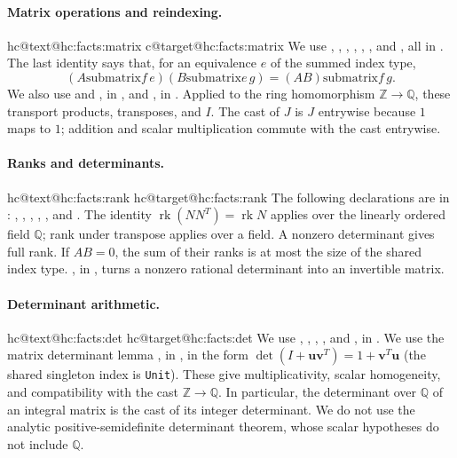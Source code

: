 \documentclass[11pt]{amsart}
\makeatletter
\newcommand\ints{{\mathbb Z}}
\newcommand\rats{{\mathbb Q}}
\newcommand\Zu{{\mathbf u}}
\newcommand\Zv{{\mathbf v}}
\let\hcSavedLabel\label
\renewcommand{\label}[1]{%
  \hcSavedLabel{#1}%
  \expandafter\protected@xdef\csname hc@text@#1\endcsname{\@currentlabel}%
  \expandafter\xdef\csname hc@target@#1\endcsname{\@currentHref}}
\makeatother
\begin{document}
\paragraph{Matrix operations and reindexing.}\makeatletter{}\makeatother\label{hc:facts:matrix}
\uses{}
We use , ,
, ,
, , and
, all in .
The last identity says that, for
an equivalence $e$ of the summed index type,
\[
 (A\mathbin{\mathrm{submatrix}}f\,e)
 (B\mathbin{\mathrm{submatrix}}e\,g)
       =(AB)\mathbin{\mathrm{submatrix}}f\,g.
\]
We also use  and
, in
, and , in
. Applied to the ring homomorphism
$\ints\to\rats$, these transport products, transposes, and $I$.
The cast of $J$ is $J$ entrywise because $1$ maps to $1$; addition
and scalar multiplication commute with the cast entrywise.

\paragraph{Ranks and determinants.}\makeatletter\def\@currentlabel{F3}\makeatother\label{hc:facts:rank}
\uses{}
The following declarations are in
:
, ,
, ,
, and
.
The identity $\operatorname{rk}(NN^T)=\operatorname{rk}N$ applies over
the linearly ordered field $\rats$; rank under transpose applies over
a field. A nonzero determinant gives full rank. If $AB=0$, the sum
of their ranks is at most the size of the shared index type.
, in
, turns a nonzero
rational determinant into an invertible matrix.

\paragraph{Determinant arithmetic.}\makeatletter\def\@currentlabel{F4}\makeatother\label{hc:facts:det}
\uses{}
We use , ,
, , and , in
.
We use the matrix determinant lemma
, in
, in the form
$\det(I+\Zu\Zv^T)=1+\Zv^T\Zu$ (the shared singleton index is
\texttt{Unit}). These give multiplicativity, scalar homogeneity,
and compatibility with the cast $\ints\to\rats$. In particular, the
determinant over $\rats$ of an integral matrix is the cast of its
integer determinant. We do not use the analytic
positive-semidefinite determinant theorem, whose scalar hypotheses
do not include $\rats$.
\end{document}
